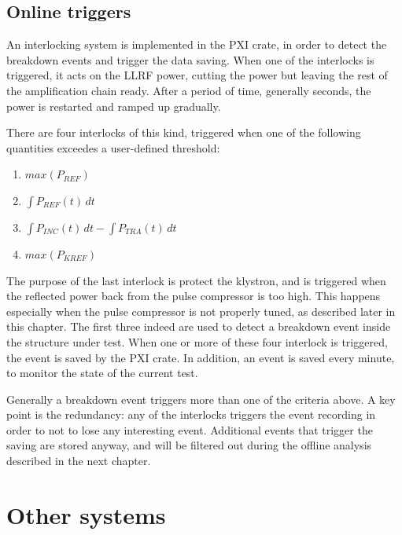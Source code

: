 \subsection[Online triggers]{Online triggers}
 \label{subs:itlk}

An interlocking system is implemented in the PXI crate, in order to detect the breakdown events and trigger the data saving. When one of the interlocks is triggered, it acts on the LLRF power, cutting the power but leaving the rest of the amplification chain ready. After a period of time, generally seconds, the power is restarted and ramped up gradually.

There are four interlocks of this kind, triggered when one of the following quantities exceedes a user-defined threshold:
\begin{enumerate}
\item { $max(P_{REF})$}
\item { $\int P_{REF}(t) \, dt $}
\item { $\int P_{INC}(t)\,dt - \int P_{TRA}(t)\,dt$}
\item { $max(P_{KREF})$}
\end{enumerate}
The purpose of the last interlock is protect the klystron, and is triggered when the reflected power back from the pulse compressor is too high. This happens especially when the pulse compressor is not properly tuned, as described later in this chapter.
The first three indeed are used to detect a breakdown event inside the structure under test. When one or more of these four interlock is triggered, the event is saved by the PXI crate. In addition, an event is saved every minute, to monitor the state of the current test.

Generally a breakdown event triggers more than one of the criteria above. A key point is the redundancy: any of the interlocks triggers the event recording in order to not to lose any interesting event. Additional events that trigger the saving are stored anyway, and will be filtered out during the offline analysis described in the next chapter.


\section[Other systems]{Other systems}

